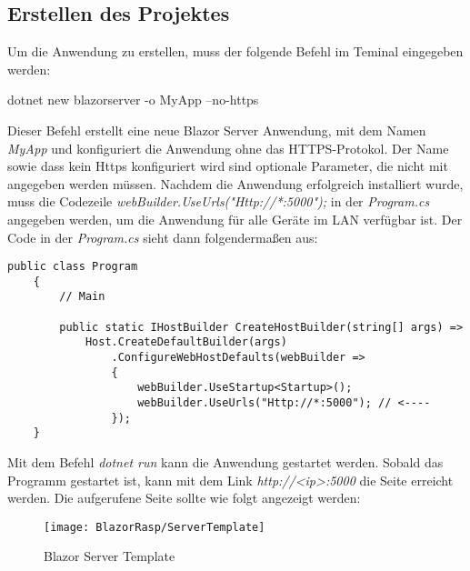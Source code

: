 \subsection{Erstellen des Projektes}
\label{subsec:erstellenProject}
Um die Anwendung zu erstellen, muss der folgende Befehl im Teminal
eingegeben werden:

\begin{zitat}
    dotnet new blazorserver -o MyApp --no-https
\end{zitat}

Dieser Befehl erstellt eine neue Blazor Server Anwendung, mit dem Namen \emph{MyApp} und
konfiguriert die Anwendung ohne das HTTPS-Protokol. Der Name sowie dass kein Https konfiguriert
wird sind optionale Parameter, die nicht mit angegeben werden müssen. Nachdem die Anwendung
erfolgreich installiert wurde, muss die Codezeile \emph{webBuilder.UseUrls("Http://*:5000");
} in der \emph{Program.cs} angegeben werden, um die Anwendung für alle Geräte im LAN verfügbar
ist. Der Code in der \emph{Program.cs} sieht dann folgendermaßen aus:

\begin{lstlisting}[language={[Sharp]C}, caption=Program.cs Code,
    label=lst:programCsCode]
    public class Program
    {
        // Main

        public static IHostBuilder CreateHostBuilder(string[] args) =>
            Host.CreateDefaultBuilder(args)
                .ConfigureWebHostDefaults(webBuilder =>
                {
                    webBuilder.UseStartup<Startup>();
                    webBuilder.UseUrls("Http://*:5000"); // <----
                });
    }
\end{lstlisting}

Mit dem Befehl \emph{dotnet run} kann die Anwendung gestartet werden. Sobald das Programm
gestartet ist, kann mit dem Link \emph{http://<ip>:5000} die Seite erreicht werden. Die
aufgerufene Seite sollte wie folgt angezeigt werden:

\begin{figure}[h]
    \centering
    \texttt{[image: BlazorRasp/ServerTemplate]}
    \caption[Blazor Server Template]{Blazor Server Template}
    \label{img:BlazorServerTemplate}
\end{figure}